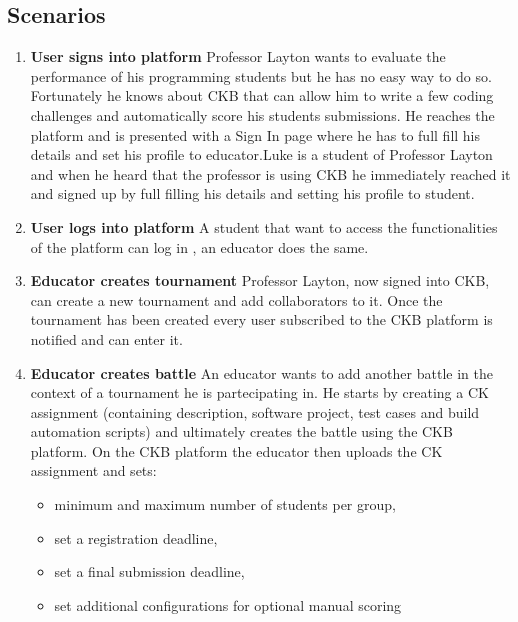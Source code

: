 \subsection{Scenarios}
\begin{enumerate}
    \item \textbf{User signs into platform}\newline
    Professor Layton wants to evaluate the performance of his programming students but he has no easy way to do so. Fortunately he knows about \ac{CKB} that can allow him to write a few coding challenges and automatically score his students submissions. He reaches the platform and is presented with a Sign In page where he has to full fill his details and set his profile to educator.\newline Luke is a student of Professor Layton and when he heard that the professor is using \ac{CKB} he immediately reached it and signed up by full filling his details and setting his profile to student.
    
    \item \textbf{User logs into platform}\newline
    A student that want to access the functionalities of the platform can log in , an educator does the same.
    
    
    \item \textbf{Educator creates tournament}\newline
    Professor Layton, now signed into \ac{CKB}, can create a new tournament and add collaborators to it. Once the tournament has been created every user subscribed to the \ac{CKB} platform is notified and can enter it.
    
    \item \textbf{Educator creates battle}\newline
    An educator wants to add another battle in the context of a tournament he is partecipating in. 
    He starts by creating a \ac{CK} assignment (containing description, software project, test cases and build automation scripts) and ultimately creates the battle using the \ac{CKB} platform.  
    On the \ac{CKB} platform the educator then uploads the \ac{CK} assignment and sets:
    \begin{itemize}
        \item minimum and maximum number of students per group,
        \item set a registration deadline,
        \item set a final submission deadline,
        \item set additional configurations for optional manual scoring 
    \end{itemize}
    

\end{enumerate}
